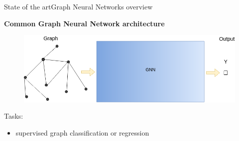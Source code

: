 \documentclass[xcolor=table]{beamer}
\begin{document}
\begin{frame}{State of the art}{Graph Neural Networks overview}

\textbf{Common Graph Neural Network architecture}
\begin{figure}
    \includegraphics[scale=0.37]{./img/GNN_explanation_01b.png}
\end{figure}

\vspace{8px}
Tasks:
\begin{itemize}
    \item supervised graph classification or regression
\end{itemize}

\end{frame}
\end{document}
